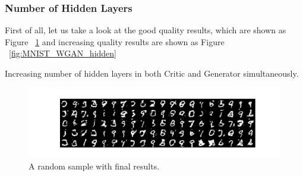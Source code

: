 \documentclass[12pt,letterpaper]{article}
\begin{document}
\subsubsection{Number of Hidden Layers}

First of all, let us take a look at the good quality results, which are shown as Figure ~\ref{fig:MNIST_WGAN_hidden_results} and increasing quality results are shown as Figure ~\ref{fig:MNIST_WGAN_hidden}

Increasing number of hidden layers in both Critic and Generator simultaneously. 
\begin{figure}[h]
    \centering
    \includegraphics[width=.6\linewidth]{WGAN_MNIST_2_100_256results.png}
    \caption{\small A random sample with final results.}
    \label{fig:MNIST_WGAN_hidden_results}
\end{figure}
\end{document}
